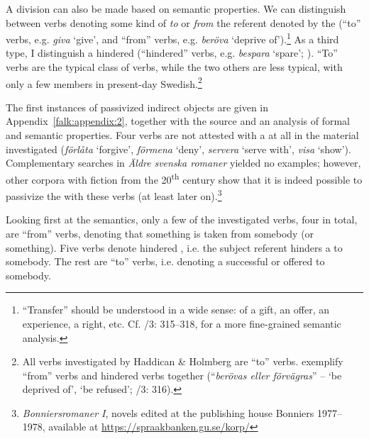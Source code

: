 \documentclass[output=paper]{langscibook}
\begin{document}
A division can also be made based on semantic properties. We can distinguish between  verbs denoting some kind of  \textit{to} or  \textit{from} the referent denoted by the  (“to” verbs, e.g. \textit{giva} ‘give’, and “from” verbs, e.g. \textit{beröva} ‘deprive of’).\footnote{“Transfer” should be understood in a wide sense:  of a gift, an offer, an experience, a right, etc. Cf. \citealt{TelemanEtAl1999}/3: 315–318, \citet{Valdeson2021} for a more fine-grained semantic analysis.} As a third type, I distinguish a hindered  (“hindered” verbs, e.g. \textit{bespara} ‘spare’; \citealt{Valdeson2021}). “To” verbs are the typical class of  verbs, while the two others are less typical, with only a few members in present-day Swedish.\footnote{All verbs investigated by Haddican \& Holmberg are “to” verbs. \citet{TelemanEtAl1999} exemplify “from” verbs and hindered  verbs together (“\textit{berövas eller förvägras}” – ‘be deprived of’, ‘be refused’; \citealt{TelemanEtAl1999}/3: 316).} 



The first instances of passivized indirect objects are given in Appendix~\ref{falk:appendix:2}, together with the source and an analysis of formal and semantic properties. Four verbs are not attested with a  at all in the material investigated (\textit{förlåta} ‘forgive’, \textit{förmena} ‘deny’, \textit{servera} ‘serve with’, \textit{visa} ‘show’). Complementary searches in \textit{Äldre} \textit{svenska romaner} yielded no examples; however, other corpora with fiction from the 20\textsuperscript{th} century show that it is indeed possible to passivize the  with these verbs (at least later on).\footnote{\textit{Bonniersromaner I}, novels edited at the publishing house Bonniers 1977–1978, available at \url{https://spraakbanken.gu.se/korp/}} 



Looking first at the semantics, only a few of the investigated verbs, four in total, are “from” verbs, denoting that something is taken from somebody (or something). Five verbs denote hindered , i.e. the subject referent hinders a  to somebody. The rest are “to” verbs, i.e. denoting a successful or offered  to somebody. 
\end{document}
